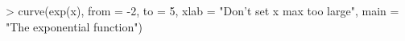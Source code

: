 \begin{Schunk}
\begin{Sinput}
> curve(exp(x), from = -2, to = 5, xlab = "Don't set x max too large", main = "The exponential function")
\end{Sinput}
\end{Schunk}
